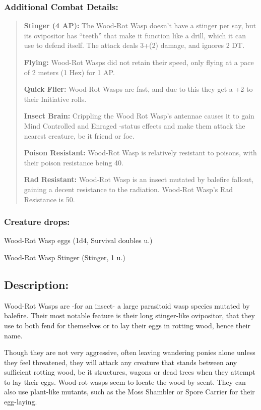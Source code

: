 \documentclass[11pt,a4paper,twocolumn]{book}
\begin{document}
	\subsubsection*{Additional Combat Details:}
	\begin{verse}
		\textbf{Stinger (4 AP):} The Wood-Rot Wasp doesn't have a stinger per say, but its ovipositor has ``teeth'' that make it function like a drill, which it can use to defend itself. The attack deals 3+(2) damage, and ignores 2 DT.
		
		\textbf{Flying:} Wood-Rot Wasps did not retain their speed, only flying at a pace of 2 meters (1 Hex) for 1 AP.
		
		\textbf{Quick Flier:} Wood-Rot Wasps are fast, and due to this they get a +2 to their Initiative rolls.
		
		\textbf{Insect Brain:} Crippling the Wood Rot Wasp's antennae causes it to gain Mind Controlled and Enraged -status effects and make them attack the nearest creature, be it friend or foe.
		
		\textbf{Poison Resistant:} Wood-Rot Wasp is relatively resistant to poisons, with their poison resistance being 40.
		
		\textbf{Rad Resistant:} Wood-Rot Wasp is an insect mutated by balefire fallout, gaining a decent resistance to the radiation. Wood-Rot Wasp's Rad Resistance is 50.
	\end{verse}
	
	\subsubsection*{Creature drops:}
	\begin{compactitem}
		\item Wood-Rot Wasp eggs (1d4, Survival doubles u.)
		\item Wood-Rot Wasp Stinger (Stinger, 1 u.)
	\end{compactitem}
	
	\subsection*{Description:}
	Wood-Rot Wasps are -for an insect- a large parasitoid wasp species mutated by balefire. Their most notable feature is their long stinger-like ovipositor, that they use to both fend for themselves or to lay their eggs in rotting wood, hence their name.
	
	Though they are not very aggressive, often leaving wandering ponies alone unless they feel threatened, they will attack any creature that stands between any sufficient rotting wood, be it structures, wagons or dead trees when they attempt to lay their eggs. Wood-rot wasps seem to locate the wood by scent. They can also use plant-like mutants, such as the Moss Shambler or Spore Carrier for their egg-laying.
	
\end{document}
